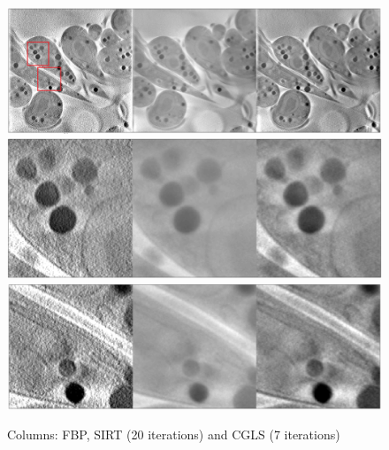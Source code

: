 \begin{figure}
\begin{center}

\includegraphics[width=\textwidth]{Applications/FBP_SIRT_CGLSm.png} 
\includegraphics[width=\textwidth]{Applications/FBP_SIRT_CGLSz1.png} 
\includegraphics[width=\textwidth]{Applications/FBP_SIRT_CGLSz2.png} 

\end{center}

\caption[Cell image recosntructed with different algorithms 1-1]{\label{fig:CGLSSIRT} Columns: FBP, SIRT (20 iterations) and CGLS (7 iterations)} 
\end{figure}


